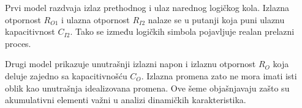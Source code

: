 Prvi model razdvaja izlaz prethodnog i ulaz narednog logičkog kola. Izlazna otpornost $R_{O1}$ i ulazna otpornost $R_{I2}$ nalaze se u putanji koja puni ulaznu kapacitivnost $C_{I2}$. Tako se između logičkih simbola pojavljuje realan prelazni proces.

Drugi model prikazuje unutrašnji izlazni napon i izlaznu otpornost $R_O$ koja deluje zajedno sa kapacitivnošću $C_O$. Izlazna promena zato ne mora imati isti oblik kao unutrašnja idealizovana promena. Ove šeme objašnjavaju zašto su akumulativni elementi važni u analizi dinamičkih karakteristika.
